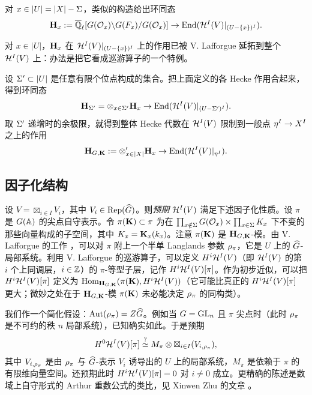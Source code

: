 对 $x\in |U|=|X|-\Sig$，类似的构造给出环同态
\begin{equation*}
\bH_{x}:=\Qlbar[G(\cO_{x})\bs G(F_{x})/G(\cO_{x})]\to \End(\cH^{I}(V)|_{(U-\{x\})^{I}}).
\end{equation*}

\begin{rmk} 对 $x\in |U|$，$\bH_{x}$ 在 $\cH^{I}(V)|_{(U-\{x\})^{I}}$ 上的作用已被 V. Lafforgue 延拓到整个 $\cH^{I}(V)$ 上：办法是把它看成巡游算子的一个特例。
\end{rmk}

设 $\Sig'\subset |U|$ 是任意有限个位点构成的集合。把上面定义的各 Hecke 作用合起来，得到环同态
\begin{equation*}
\bH_{\Sig'}=\ot_{x\in \Sig'}\bH_{x}\to \End(\cH^{I}(V)|_{(U-\Sig')^{I}}).
\end{equation*}
取 $\Sig'$ 递增时的余极限，就得到整体 Hecke 代数在 $\cH^{I}(V)$ 限制到一般点 $\y^{I}\to X^{I}$ 之上的作用
\begin{equation*}
\bH_{G,\bK}:=\ot'_{x\in |X|}\bH_{x}\to \End(\cH^{I}(V)|_{\y^{I}}).
\end{equation*}

\subsection{因子化结构}

设 $V=\boxtimes_{i\in I}V_{i}$，其中 $V_{i}\in \Rep(\dG)$。则\emph{预期} $\cH^{I}(V)$ 满足下述因子化性质。设 $\pi$ 是 $G(\AA)$ 的尖点自守表示。令 $\pi(\bK)\subset \pi$ 为在 $\prod_{x\notin\Sig}G(\cO_{x})\times \prod_{x\in \Sig}K_{x}$ 下不变的那些向量构成的子空间，其中 $K_{x}=\bK_{x}(k_{x})$。注意 $\pi(\bK)$ 是 $\bH_{G,\bK}$-模。由 V. Lafforgue 的工作 \cite{VLaff}，可以对 $\pi$ 附上一个半单 Langlands 参数 $\r_{\pi}$，它是 $U$ 上的 $\dG$-局部系统。利用 V. Lafforgue 的巡游算子，可以定义 $H^{i}\cH^{I}(V)$（即 $\cH^{I}(V)$ 的第 $i$ 个上同调层，$i\in \ZZ$）的 $\pi$-等型子层，记作 $H^{i}\cH^{I}(V)[\pi]$。作为初步近似，可以把 $H^{i}\cH^{I}(V)[\pi]$ 定义为 $\Hom_{\bH_{G,\bK}}(\pi(\bK), H^{i}\cH^{I}(V))$（它可能比真正的 $H^{i}\cH^{I}(V)[\pi]$ 更大；微妙之处在于 $\bH_{G,\bK}$-模 $\pi(\bK)$ 未必能决定 $\r_{\pi}$ 的同构类）。

我们作一个简化假设：$\Aut(\r_{\pi})=Z\dG$。例如当 $G=\GL_{n}$ 且 $\pi$ 尖点时（此时 $\r_{\pi}$ 是不可约的秩 $n$ 局部系统），已知确实如此。于是预期
\begin{equation*}
H^{0}\cH^{I}(V)[\pi]\stackrel{?}{\simeq} M_{\pi}\ot \boxtimes_{i\in I}(V_{i,\r_{\pi}}),
\end{equation*}
其中 $V_{i,\r_{\pi}}$ 是由 $\r_{\pi}$ 与 $\dG$-表示 $V_{i}$ 诱导出的 $U$ 上的局部系统，$M_{\pi}$ 是依赖于 $\pi$ 的有限维向量空间。还预期此时 $H^{i}\cH^{I}(V)[\pi]=0$ 对 $i\ne0$ 成立。更精确的陈述是数域上自守形式的 Arthur 重数公式的类比，见 Xinwen Zhu 的文章 \cite[\S4.7]{Zhu}。

